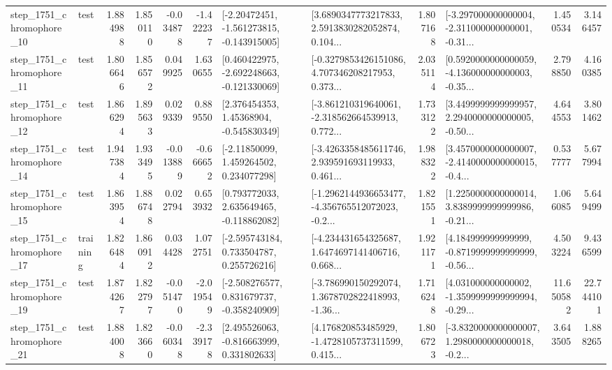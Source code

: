 \begin{tabular}{llrrrrllrlrr}
 step\_1751\_chromophore\_10 &      test &      1.884988 &    1.850110 &     -0.034878 & -1.422237 &   [-2.20472451, -1.561273815, -0.143915005] &  [3.6890347773217833, 2.5913830282052874, 0.104... &       1.807168 &  [-3.297000000000004, -2.311000000000001, -0.31... &            1.450534 &          3.146457 \\
 step\_1751\_chromophore\_11 &      test &      1.806646 &    1.856572 &      0.049925 &  1.630655 &   [0.460422975, -2.692248663, -0.121330069] &  [-0.3279853426151086, 4.707346208217953, 0.373... &       2.035114 &  [0.5920000000000059, -4.136000000000003, -0.35... &            2.798850 &          4.160385 \\
 step\_1751\_chromophore\_12 &      test &      1.866294 &    1.895633 &      0.029339 &  0.889550 &     [2.376454353, 1.45368904, -0.545830349] &  [-3.861210319640061, -2.318562664539913, 0.772... &       1.733122 &  [3.4499999999999957, 2.2940000000000005, -0.50... &            4.644553 &          3.801462 \\
 step\_1751\_chromophore\_14 &      test &      1.947384 &    1.933495 &     -0.013889 & -0.666652 &     [-2.11850099, 1.459264502, 0.234077298] &  [-3.4263358485611746, 2.939591693119933, 0.461... &       1.988322 &  [3.4570000000000007, -2.4140000000000015, -0.4... &            0.537777 &          5.677994 \\
 step\_1751\_chromophore\_15 &      test &      1.863954 &    1.886748 &      0.022794 &  0.653932 &    [0.793772033, 2.635649465, -0.118862082] &  [-1.2962144936653477, -4.356765512072023, -0.2... &       1.821551 &  [1.2250000000000014, 3.8389999999999986, -0.21... &            1.066085 &          5.649499 \\
 step\_1751\_chromophore\_17 &  training &      1.826484 &    1.860912 &      0.034428 &  1.072751 &    [-2.595743184, 0.733504787, 0.255726216] &  [-4.234431654325687, 1.6474697141406716, 0.668... &       1.921171 &  [4.184999999999999, -0.8719999999999999, -0.56... &            4.503224 &          9.436599 \\
 step\_1751\_chromophore\_19 &      test &      1.874267 &    1.822797 &     -0.051470 & -2.019549 &   [-2.508276577, 0.831679737, -0.358240909] &  [-3.786990150292074, 1.3678702822418993, -1.36... &       1.716248 &  [4.031000000000002, -1.3599999999999994, -0.29... &           11.650582 &         22.744101 \\
 step\_1751\_chromophore\_21 &      test &      1.884008 &    1.823660 &     -0.060348 & -2.339178 &    [2.495526063, -0.816663999, 0.331802633] &  [4.176820853485929, -1.4728105737311599, 0.415... &       1.806723 &  [-3.8320000000000007, 1.2980000000000018, -0.2... &            3.643505 &          1.888265 \\

\end{tabular}
